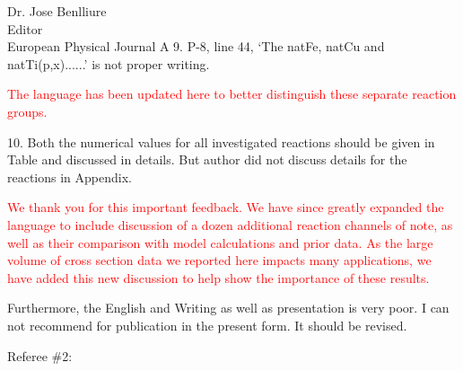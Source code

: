 \documentclass{letter} %
\newcommand{\colornote}[1]{\textcolor{red}{#1}}
\begin{document}
\begin{letter}{Dr. Jose Benlliure \\
Editor \\
European Physical Journal A}
9. P-8, line 44, ‘The natFe, natCu and natTi(p,x)......’ is not proper writing.

\colornote{The language has been updated here to better distinguish these separate reaction groups.}

10. Both the numerical values for all investigated reactions should be given in Table and discussed in
details. But author did not discuss details for the reactions in Appendix.

\colornote{We thank you for this important feedback. We have since greatly expanded the language to include discussion of a dozen additional reaction channels of note, as well as their comparison with model calculations and prior data. As the large volume of cross section data we reported here  impacts  many applications,  we have added this new discussion to help show the importance of these results.}

Furthermore, the English and Writing as well as presentation is very poor. I can not recommend for
publication in the present form. It should be revised.





 
 
\pagebreak


 Referee \#2:




\end{letter}
\end{document}
